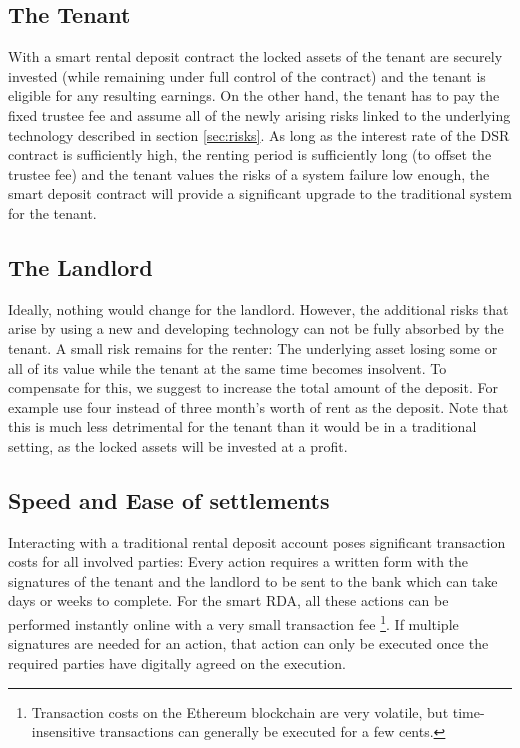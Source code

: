 \documentclass[12pt,a4paper,titlepage,oneside,english]{article}
\begin{document}
\subsection{The Tenant}
With a smart rental deposit contract the locked assets of the tenant are securely invested (while remaining under full control of the contract) and the tenant is eligible for any resulting earnings. On the other hand, the tenant has to pay the fixed trustee fee and assume all of the newly arising risks linked to the underlying technology described in section \ref{sec:risks}. As long as the interest rate of the DSR contract is sufficiently high, the renting period is sufficiently long (to offset the trustee fee) and the tenant values the risks of a system failure low enough, the smart deposit contract will provide a significant upgrade to the traditional system for the tenant.

\subsection{The Landlord}
Ideally, nothing would change for the landlord. However, the additional risks that arise by using a new and developing technology can not be fully absorbed by the tenant. A small risk remains for the renter: The underlying asset losing some or all of its value while the tenant at the same time becomes insolvent. 
To compensate for this, we suggest to increase the total amount of the deposit. For example use four instead of three month's worth of rent as the deposit. Note that this is much less detrimental for the tenant than it would be in a traditional setting, as the locked assets will be invested at a profit.

\subsection{Speed and Ease of settlements}
Interacting with a traditional rental deposit account poses significant transaction costs for all involved parties: Every action requires a written form with the signatures of the tenant and the landlord to be sent to the bank which can take days or weeks to complete. For the smart RDA, all these actions can be performed instantly online with a very small transaction fee \footnote{Transaction costs on the Ethereum blockchain are very volatile, but time-insensitive transactions can generally be executed for a few cents.}. If multiple signatures are needed for an action, that action can only be executed once the required parties have digitally agreed on the execution.
\end{document}
